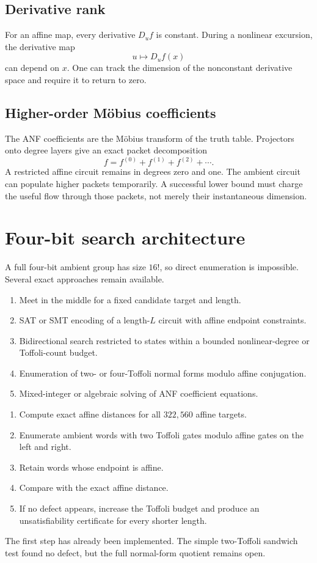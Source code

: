 \subsection{Derivative rank}
For an affine map, every derivative $D_u f$ is constant.  During a nonlinear excursion, the derivative map
\[
u\mapsto D_u f(x)
\]
can depend on $x$.  One can track the dimension of the nonconstant derivative space and require it to return to zero.

\subsection{Higher-order Möbius coefficients}
The ANF coefficients are the Möbius transform of the truth table.  Projectors onto degree layers give an exact packet decomposition
\[
f=f^{(0)}+f^{(1)}+f^{(2)}+\cdots.
\]
A restricted affine circuit remains in degrees zero and one.  The ambient circuit can populate higher packets temporarily.  A successful lower bound must charge the useful flow through those packets, not merely their instantaneous dimension.

\section{Four-bit search architecture}
A full four-bit ambient group has size $16!$, so direct enumeration is impossible.  Several exact approaches remain available.
\begin{enumerate}
\item Meet in the middle for a fixed candidate target and length.
\item SAT or SMT encoding of a length-$L$ circuit with affine endpoint constraints.
\item Bidirectional search restricted to states within a bounded nonlinear-degree or Toffoli-count budget.
\item Enumeration of two- or four-Toffoli normal forms modulo affine conjugation.
\item Mixed-integer or algebraic solving of ANF coefficient equations.
\end{enumerate}

\begin{protocol}
\begin{enumerate}
\item Compute exact affine distances for all $322{,}560$ affine targets.
\item Enumerate ambient words with two Toffoli gates modulo affine gates on the left and right.
\item Retain words whose endpoint is affine.
\item Compare with the exact affine distance.
\item If no defect appears, increase the Toffoli budget and produce an unsatisfiability certificate for every shorter length.
\end{enumerate}
\end{protocol}
The first step has already been implemented.  The simple two-Toffoli sandwich test found no defect, but the full normal-form quotient remains open.

